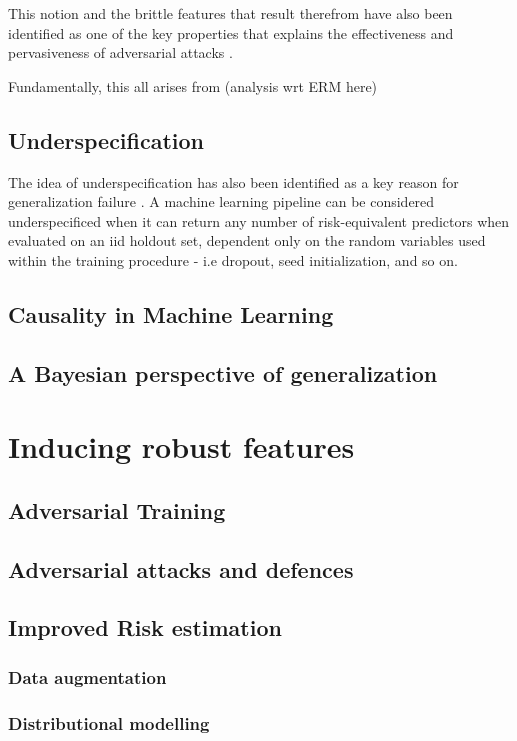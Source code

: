 		This notion and the brittle features that result therefrom have also been identified as one of the key properties that explains the effectiveness and pervasiveness of adversarial attacks \cite{adversarial_bugs_features}. 

		Fundamentally, this all arises from (analysis wrt ERM here)		
		
		\subsection{Underspecification}
			The idea of underspecification has also been identified as a key reason for generalization failure \cite{damour2020underspecification}. A machine learning pipeline can be considered underspecificed when it can return any number of risk-equivalent predictors when evaluated on an iid holdout set, dependent only on the random variables used within the training procedure - i.e dropout, seed initialization, and so on.
			
			
		\subsection{Causality in Machine Learning}
		\subsection{A Bayesian perspective of generalization}
		
\section{Inducing robust features}
	\subsection{Adversarial Training}
		\subsection{Adversarial attacks and defences}
	\subsection{Improved Risk estimation}
		\subsubsection{Data augmentation}
		\subsubsection{Distributional modelling}
